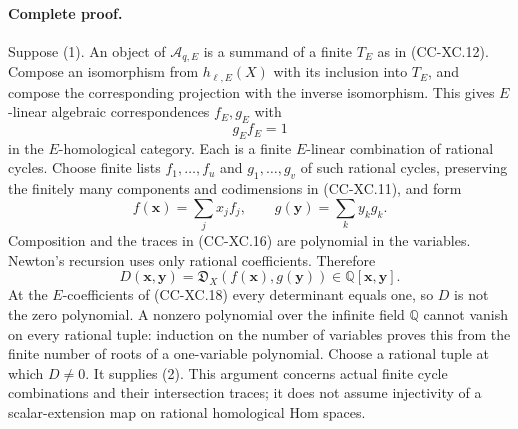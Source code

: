 \paragraph{Complete proof.}
Suppose (1).  An object of \(\mathcal A_{q,E}\) is a summand
of a finite \(T_E\) as in (CC-XC.12).  Compose an isomorphism
from \(h_{\ell,E}(X)\) with its inclusion into \(T_E\), and
compose the corresponding projection with the inverse
isomorphism.  This gives \(E\)-linear algebraic
correspondences \(f_E,g_E\) with
\[
                                  g_E f_E=1
                                                        \tag{CC-XC.18}
\]
in the \(E\)-homological category.
Each is a finite \(E\)-linear combination of rational
cycles.  Choose finite lists \(f_1,\ldots,f_u\) and
\(g_1,\ldots,g_v\) of such rational cycles, preserving
the finitely many components and codimensions in
(CC-XC.11), and form
\[
 f(\mathbf x)=\sum_jx_jf_j,\qquad
 g(\mathbf y)=\sum_ky_kg_k.
 \]
Composition and the traces in (CC-XC.16) are polynomial
in the variables.  Newton's recursion uses only rational
coefficients.  Therefore
\[
        D(\mathbf x,\mathbf y)
               =\mathfrak D_X(f(\mathbf x),g(\mathbf y))
                         \in\mathbb Q[\mathbf x,\mathbf y].
                                                        \tag{CC-XC.19}
\]
At the \(E\)-coefficients of (CC-XC.18) every determinant
equals one, so \(D\) is not the zero polynomial.
A nonzero polynomial over the infinite field \(\mathbb Q\)
cannot vanish on every rational tuple: induction on the
number of variables proves this from the finite number of
roots of a one-variable polynomial.  Choose a rational
tuple at which \(D\ne0\).  It supplies (2).
This argument concerns actual finite cycle combinations
and their intersection traces; it does not assume
injectivity of a scalar-extension map on rational
homological Hom spaces.

